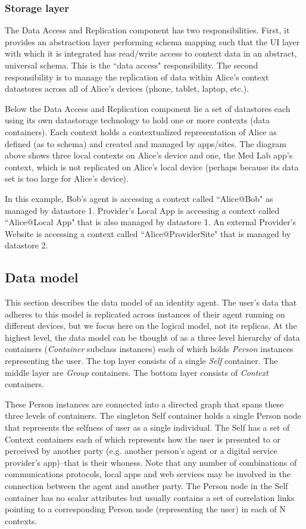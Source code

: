 \documentclass[11pt, oneside]{article}   	%
\begin{document}
\subsubsection{Storage layer}

The Data Access and Replication component has two responsibilities. First, it provides an abstraction layer performing schema mapping such that the UI layer with which it is integrated has read/write access to context data in an abstract, universal schema. This is the ``data access" responsibility. The second responsibility is to manage the replication of data within Alice's context datastores across all of Alice's devices (phone, tablet, laptop, etc.). 

Below the Data Access and Replication component lie a set of datastores each using its own datastorage technology to hold one or more contexts (data containers). Each context holds a contextualized representation of Alice as defined (as to schema) and created and managed by apps/sites. The diagram above shows three local contexts on Alice's device and one, the Med Lab app's context, which is not replicated on Alice's local device (perhaps because its data set is too large for Alice's device).

In this example, Bob's agent is accessing a context called ``Alice@Bob" as managed by datastore 1. Provider's Local App is accessing a context called ``Alice@Local App" that is also managed by datastore 1.  An external Provider's Website is accessing a context called ``Alice@ProviderSite" that is managed by datastore 2. 

\subsection{Data model} %

This section describes the data model of an identity agent. The user's data that adheres to this model is replicated across instances of their agent running on different devices, but we focus here on the logical model, not its replicas. At the highest level, the data model can be thought of as a three level hierarchy of data containers (\emph{Container} subclass instances) each of which holds \emph{Person} instances representing the user. The top layer consists of a single \emph{Self} container. The middle layer are \emph{Group} containers. The bottom layer consists of \emph{Context} containers.

These Person instances are connected into a directed graph that spans these three levels of containers. The singleton Self container holds a single Person node that represents the selfness of user as a single individual. The Self has a set of Context containers each of which represents how the user is presented to or perceived by another party (e.g. another person's agent or a digital service provider's app)--that is their whoness. Note that any number of combinations of communications protocols, local apps and web services may be involved in the connection between the agent and another party. The Person node in the Self container has no scalar attributes but usually contains a set of correlation links pointing to a corresponding Person node (representing the user) in each of N contexts.
\end{document}
